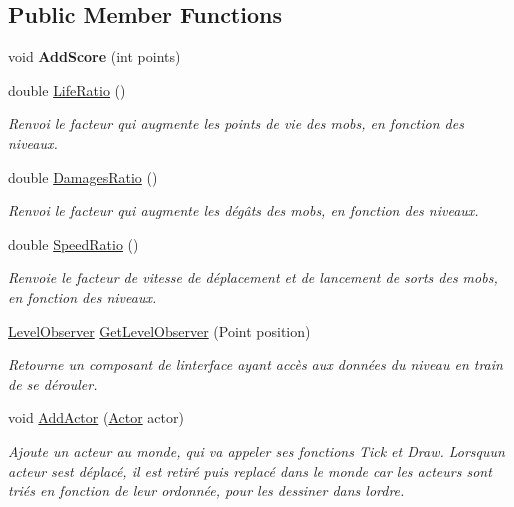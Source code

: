 \subsection*{Public Member Functions}
\begin{DoxyCompactItemize}
\item 
\mbox{\label{class_tentacle_slicers_1_1maps_1_1_world_ab55d73a8b605af1c6c51d2652d854b9a}} 
void {\bfseries Add\+Score} (int points)
\item 
double \hyperlink{class_tentacle_slicers_1_1maps_1_1_world_a1621a82ae5b10a2e8346458afab52ed8}{Life\+Ratio} ()
\begin{DoxyCompactList}\small\item\em Renvoi le facteur qui augmente les points de vie des mobs, en fonction des niveaux. \end{DoxyCompactList}\item 
double \hyperlink{class_tentacle_slicers_1_1maps_1_1_world_a41d0d2bfd31016cd3ae740cc7caf1cfb}{Damages\+Ratio} ()
\begin{DoxyCompactList}\small\item\em Renvoi le facteur qui augmente les dégâts des mobs, en fonction des niveaux. \end{DoxyCompactList}\item 
double \hyperlink{class_tentacle_slicers_1_1maps_1_1_world_a383fb2d74c13c7b775077bc40ace811c}{Speed\+Ratio} ()
\begin{DoxyCompactList}\small\item\em Renvoie le facteur de vitesse de déplacement et de lancement de sorts des mobs, en fonction des niveaux. \end{DoxyCompactList}\item 
\hyperlink{class_tentacle_slicers_1_1hud_1_1_level_observer}{Level\+Observer} \hyperlink{class_tentacle_slicers_1_1maps_1_1_world_af2e84a1b1b30adaa42efe2dc064d6135}{Get\+Level\+Observer} (Point position)
\begin{DoxyCompactList}\small\item\em Retourne un composant de l\textquotesingle{}interface ayant accès aux données du niveau en train de se dérouler. \end{DoxyCompactList}\item 
void \hyperlink{class_tentacle_slicers_1_1maps_1_1_world_a50ddf5fe23bb64a24f987dd6019b4105}{Add\+Actor} (\hyperlink{class_tentacle_slicers_1_1actors_1_1_actor}{Actor} actor)
\begin{DoxyCompactList}\small\item\em Ajoute un acteur au monde, qui va appeler ses fonctions Tick et Draw. Lorsqu\textquotesingle{}un acteur s\textquotesingle{}est déplacé, il est retiré puis replacé dans le monde car les acteurs sont triés en fonction de leur ordonnée, pour les dessiner dans l\textquotesingle{}ordre. \end{DoxyCompactList}\item 

\end{DoxyCompactItemize}
